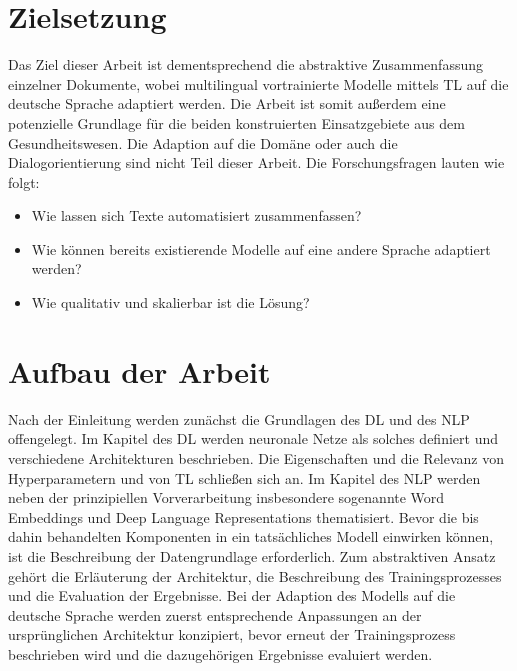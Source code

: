 \newpage


\section{Zielsetzung}
Das Ziel dieser Arbeit ist dementsprechend die abstraktive Zusammenfassung einzelner Dokumente, wobei multilingual vortrainierte Modelle mittels \ac{TL} auf die deutsche Sprache adaptiert werden. Die Arbeit ist somit außerdem eine potenzielle Grundlage für die beiden konstruierten Einsatzgebiete aus dem Gesundheitswesen. Die Adaption auf die Domäne oder auch die Dialogorientierung sind nicht Teil dieser Arbeit. Die Forschungsfragen lauten wie folgt:

\begin{itemize}
	\item Wie lassen sich Texte automatisiert zusammenfassen?
	\item Wie können bereits existierende Modelle auf eine andere Sprache adaptiert werden?
	\item Wie qualitativ und skalierbar ist die Lösung?
\end{itemize}


\section{Aufbau der Arbeit}
Nach der Einleitung werden zunächst die Grundlagen des \ac{DL} und des \ac{NLP} offengelegt. Im Kapitel des \ac{DL} werden neuronale Netze als solches definiert und verschiedene Architekturen beschrieben. Die Eigenschaften und die Relevanz von Hyperparametern und von \ac{TL} schließen sich an. Im Kapitel des \ac{NLP} werden neben der prinzipiellen Vorverarbeitung insbesondere sogenannte Word Embeddings und Deep Language Representations thematisiert. Bevor die bis dahin behandelten Komponenten in ein tatsächliches Modell einwirken können, ist die Beschreibung der Datengrundlage erforderlich. Zum abstraktiven Ansatz gehört die Erläuterung der Architektur, die Beschreibung des Trainingsprozesses und die Evaluation der Ergebnisse. Bei der Adaption des Modells auf die deutsche Sprache werden zuerst entsprechende Anpassungen an der ursprünglichen Architektur konzipiert, bevor erneut der Trainingsprozess beschrieben wird und die dazugehörigen Ergebnisse evaluiert werden.


